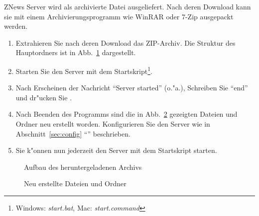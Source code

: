 ZNews Server wird als archivierte Datei ausgeliefert.
Nach deren Download kann sie mit einem Archivierungsprogramm
wie WinRAR oder 7-Zip ausgepackt werden.

\begin{enumerate}
    \item Extrahieren Sie nach deren Download das ZIP-Archiv.
    Die Struktur des Hauptordners ist in Abb.~\ref{fig:dirtree1} dargestellt.
    \item Starten Sie den Server mit dem Startskript\footnote{%
    Windows: \emph{start.bat}, Mac: \emph{start.command}}.
    \item Nach Erscheinen der Nachricht ``Server started'' (o."a.),
    Schreiben Sie ``end'' und dr"ucken Sie .
    \item Nach Beenden des Programms sind die in Abb.~\ref{fig:dirtree2}
    gezeigten Dateien und Ordner neu erstellt worden.
    Konfigurieren Sie den Server wie in Abschnitt~\ref{sec:config} ``'' beschrieben.
    \item Sie k"onnen nun jederzeit den Server mit dem Startskript starten.
\end{enumerate}

\begin{figure}[htb]
    \caption{\label{fig:dirtree1}Aufbau des heruntergeladenen Archivs}
\end{figure}

\begin{figure}[htb]
    \caption{\label{fig:dirtree2}Neu erstellte Dateien und Ordner}
\end{figure}
